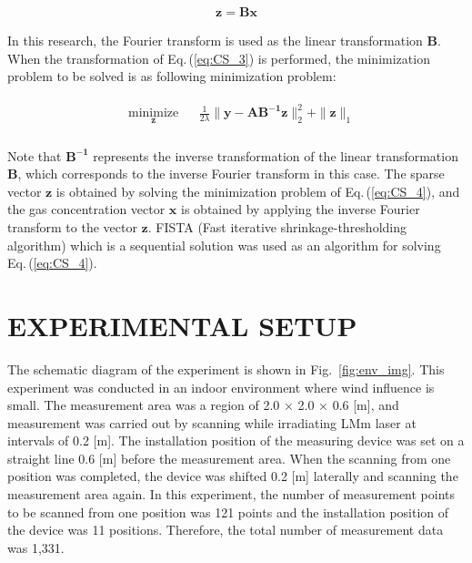\documentclass[fleqn,10pt,twocolumn]{SICE19}
\newcommand{\Figref}[1]{Fig.~\ref{#1}}
\newcommand{\Eqref}[1]{Eq.\,(\ref{#1})}
\begin{document}
\begin{eqnarray}
  \label{eq:CS_3}
  \bm{z} = \bm{B}\bm{x}
\end{eqnarray}

\noindent
In this research, the Fourier transform is used as the linear transformation $\bm{B}$. When the transformation of \Eqref{eq:CS_3} is performed, the minimization problem to be solved is as following minimization problem:

\begin{eqnarray}
  \label{eq:CS_4}
  \begin{aligned}
    & \underset{{\bm z}} {\text{minimize}} &&\frac{1}{2\lambda}\|\bm{y}-\bm{A}\bm{B^{-1}}\bm{z}\|_2^2+\|\bm{z}\|_1\\
  \end{aligned}
\end{eqnarray}

\noindent
 Note that $\bm{B^{-1}}$ represents the inverse transformation of the linear transformation $\bm{B}$, which corresponds to the inverse Fourier transform in this case. The sparse vector $\bm{z}$ is obtained by solving the minimization problem of \Eqref{eq:CS_4}, and the gas concentration vector $\bm{x}$ is obtained by applying the inverse Fourier transform to the vector $\bm{z}$. FISTA (Fast iterative shrinkage-thresholding algorithm) which is a sequential solution was used as an algorithm for solving \Eqref{eq:CS_4}.


\section{EXPERIMENTAL SETUP}\label{sec:env}
The schematic diagram of the experiment is shown in \Figref{fig:env_img}. This experiment was conducted in an indoor environment where wind influence is small. The measurement area was a region of 2.0 × 2.0 × 0.6 [m], and measurement was carried out by scanning while irradiating LMm laser at intervals of 0.2 [m]. The installation position of the measuring device was set on a straight line 0.6 [m] before the measurement area. When the scanning from one position was completed, the device was shifted 0.2 [m] laterally and scanning the measurement area again. In this experiment, the number of measurement points to be scanned from one position was 121 points and the installation position of the device was 11 positions. Therefore, the total number of measurement data was 1,331.
\end{document}
